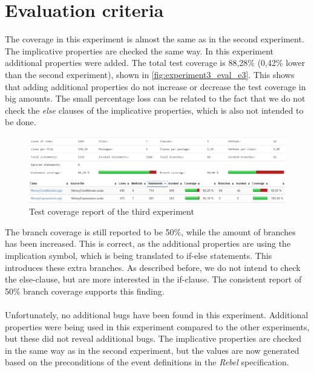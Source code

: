 \section{Evaluation criteria}
The coverage in this experiment is almost the same as in the second experiment. The implicative properties are checked the same way. In this experiment additional properties were added. The total test coverage is 88,28\% (0,42\% lower than the second experiment), shown in \autoref{fig:experiment3_eval_e3}. This shows that adding additional properties do not increase or decrease the test coverage in big amounts. The small percentage loss can be related to the fact that we do not check the \textit{else} clauses of the implicative properties, which is also not intended to be done.
\FloatBarrier
\begin{figure}[!ht]
	\includegraphics[width=\linewidth]{figures/eval_e3}
\caption{Test coverage report of the third experiment}
\label{fig:experiment3_eval_e3}
\centering
\end{figure}
\FloatBarrier
The branch coverage is still reported to be 50\%, while the amount of branches has been increased. This is correct, as the additional properties are using the implication symbol, which is being translated to if-else statements. This introduces these extra branches. As described before, we do not intend to check the else-clause, but are more interested in the if-clause. The consistent report of 50\% branch coverage supports this finding.\\
\\
Unfortunately, no additional bugs have been found in this experiment. Additional properties were being used in this experiment compared to the other experiments, but these did not reveal additional bugs. The implicative properties are checked in the same way as in the second experiment, but the values are now generated based on the preconditions of the event definitions in the \textit{Rebel} specification.\\
\\
